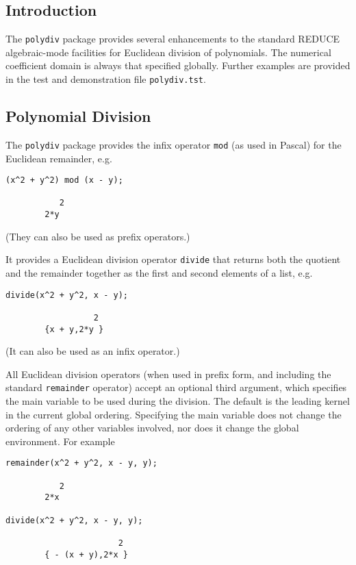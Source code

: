 
\subsection{Introduction}

The \texttt{polydiv} package provides several enhancements to the
standard REDUCE algebraic-mode facilities for Euclidean division of
polynomials.
The numerical coefficient domain is always that specified globally.
Further examples are provided in the test and demonstration file
\texttt{polydiv.tst}.


\subsection{Polynomial Division}

The \texttt{polydiv} package provides
the infix operator \texttt{mod} (as used in Pascal) for the Euclidean %
remainder, e.g.
%
\begin{verbatim}
(x^2 + y^2) mod (x - y);

           2
        2*y
\end{verbatim}
(They can also be used as prefix operators.)

It provides a Euclidean division operator \texttt{divide} that returns
both the quotient and the remainder together as the first and second
elements of a list, e.g.
\begin{verbatim}
divide(x^2 + y^2, x - y);

                  2
        {x + y,2*y }
\end{verbatim}
(It can also be used as an infix operator.)

All Euclidean division operators (when used in prefix form, and
including the standard \texttt{remainder} operator) accept an optional
third argument, which specifies the main variable to be used during
the division.  The default is the leading kernel in the current global
ordering.  Specifying the main variable does not change the ordering
of any other variables involved, nor does it change the global
environment.  For example
%
%
\begin{verbatim}
remainder(x^2 + y^2, x - y, y);

           2
        2*x

divide(x^2 + y^2, x - y, y);

                       2
        { - (x + y),2*x }
\end{verbatim}


